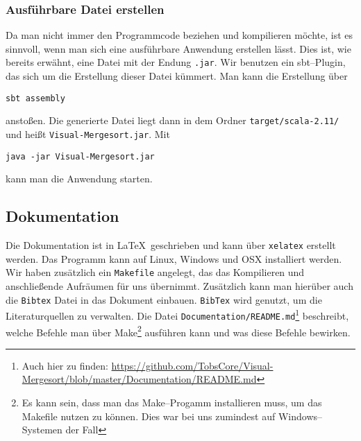\subsubsection{Ausführbare Datei erstellen}
Da man nicht immer den Programmcode beziehen und kompilieren möchte, ist es sinnvoll, wenn man sich eine ausführbare Anwendung erstellen lässt. Dies ist, wie bereits erwähnt, eine Datei mit der Endung \texttt{.jar}. Wir benutzen ein sbt--Plugin, das sich um die Erstellung dieser Datei kümmert. Man kann die Erstellung über

\begin{verbatim}
sbt assembly
\end{verbatim}

anstoßen. Die generierte Datei liegt dann in dem Ordner \texttt{target/scala-2.11/} und heißt \texttt{Visual-Mergesort.jar}. Mit

\begin{verbatim}
java -jar Visual-Mergesort.jar
\end{verbatim}

kann man die Anwendung starten.

\subsection{Dokumentation}\label{sec:latex}

Die Dokumentation ist in \LaTeX ~geschrieben und kann über \texttt{xelatex} erstellt werden. Das Programm kann auf Linux, Windows und OSX installiert werden. Wir haben zusätzlich ein \texttt{Makefile} angelegt, das das Kompilieren und anschließende Aufräumen für uns übernimmt. Zusätzlich kann man hierüber auch die \texttt{Bibtex} Datei in das Dokument einbauen. \texttt{BibTex} wird genutzt, um die Literaturquellen zu verwalten. Die Datei \texttt{Documentation/README.md}\footnote{Auch hier zu finden: \url{https://github.com/TobsCore/Visual-Mergesort/blob/master/Documentation/README.md}} beschreibt, welche Befehle man über Make\footnote{Es kann sein, dass man das Make--Progamm installieren muss, um das Makefile nutzen zu können. Dies war bei uns zumindest auf Windows--Systemen der Fall} ausführen kann und was diese Befehle bewirken.
